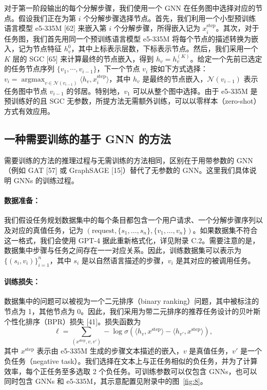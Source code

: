 \documentclass[11pt,UTF8,fontset=fandol]{ctexart}
\DeclareMathOperator*{\argmax}{argmax}
\begin{document}
对于第一阶段输出的每个分解步骤，我们使用一个 GNN 在任务图中选择对应的节点。假设我们正在为第 $i$ 个分解步骤选择节点。首先，我们利用一个小型预训练语言模型 e5-335M [62] 来嵌入第 $i$ 个分解步骤，所得嵌入记为 $x_i^{\text{step}}$。其次，对于任务图，我们首先用同一个预训练语言模型 e5-335M 将每个节点的描述转换为嵌入，记为节点特征 $h_v^0$，其中上标表示层数，下标表示节点。然后，我们采用一个 $K$ 层的 SGC [65] 来计算最终的节点嵌入，得到 $h_v = h_v^{(K)}$。给定一个先前已选定的任务节点序列 $\{v_1, \cdots, v_{i-1}\}$，下一个节点 $v_i$ 按如下方式选择：$v_i = \argmax_{v\in\mathcal{N}(v_{i-1})}\langle h_v, x_i^{\text{step}}\rangle$，其中 $h_v$ 是最终的节点嵌入，$\mathcal{N}(v_{i-1})$ 表示任务图中节点 $v_{i-1}$ 的邻居。特别地，$v_1$ 可以从整个图中选择。由于 e5-335M 是预训练好的且 SGC 无参数，所提方法无需额外训练，可以以零样本（zero-shot）方式有效应用。

\subsection{一种需要训练的基于 GNN 的方法}

需要训练的方法的推理过程与无需训练的方法相同，区别在于用带参数的 GNN（例如 GAT [57] 或 GraphSAGE [15]）替代了无参数的 GNN。这里我们具体说明 GNNs 的训练过程。

\paragraph{数据准备：}我们假设任务规划数据集中的每个条目都包含一个用户请求、一个分解步骤序列以及对应的真值任务，记为 $(\text{request}, \{s_1, \ldots, s_n\}, \{v_1, \ldots, v_n\})$。如果数据集不符合这一格式，我们会使用 GPT-4 据此重新格式化，详见附录 C.2。需要注意的是，数据集中步骤与任务之间存在一一对应关系。因此，训练数据集可以表示为 $\{(s_i, v_i)\}_{i=1}^n$，其中 $s_i$ 是以自然语言描述的步骤，$v_i$ 是其对应的被调用任务。

\paragraph{训练损失：}数据集中的问题可以被视为一个二元排序（binary ranking）问题，其中被标注的节点为 1，其他节点为 0。因此，我们采用为带二元排序的推荐任务设计的贝叶斯个性化排序（BPR）损失 [41]。损失函数为
\[
\ell = \sum_{(x^{\text{step}},v,v')} -\log \sigma\!\left(\langle h_v, x^{\text{step}}\rangle - \langle h_{v'}, x^{\text{step}}\rangle\right),
\]
其中 $x^{\text{step}}$ 表示由 e5-335M 生成的步骤文本描述的嵌入，$v$ 是真值任务，$v'$ 是一个负任务（negative task）。我们选择在文本上与正任务相似的负任务，并为了计算效率，每个正任务至多选取 2 个负任务。可训练参数可以仅包含 GNNs，也可以同时包含 GNNs 和 e5-335M，其示意配置见附录中的图~\ref{fig:8}。
\end{document}
